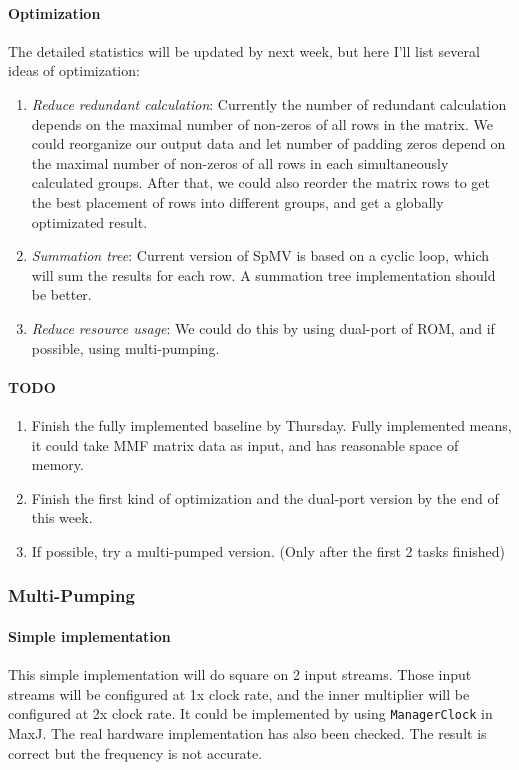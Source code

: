\paragraph{Optimization} The detailed statistics will be updated by next week, but here I'll list several ideas of optimization:
\begin{enumerate}
\item \textit{Reduce redundant calculation}: Currently the number of redundant calculation depends on the maximal number of non-zeros of all rows in the matrix. We could reorganize our output data and let number of padding zeros depend on the maximal number of non-zeros of all rows in each simultaneously calculated groups. After that, we could also reorder the matrix rows to get the best placement of rows into different groups, and get a globally optimizated result.
\item \textit{Summation tree}: Current version of SpMV is based on a cyclic loop, which will sum the results for each row. A summation tree implementation should be better.
\item \textit{Reduce resource usage}: We could do this by using dual-port of ROM, and if possible, using multi-pumping.
\end{enumerate}

\paragraph{TODO} 
\begin{enumerate}
\item Finish the fully implemented baseline by Thursday. Fully implemented means, it could take MMF matrix data as input, and has reasonable space of memory.
\item Finish the first kind of optimization and the dual-port version by the end of this week.
\item If possible, try a multi-pumped version. (Only after the first 2 tasks finished)
\end{enumerate}

\subsubsection{Multi-Pumping}

\paragraph{Simple implementation} This simple implementation will do square on 2 input streams. Those input streams will be configured at 1x clock rate, and the inner multiplier will be configured at 2x clock rate. It could be implemented by using \texttt{ManagerClock} in MaxJ. The real hardware implementation has also been checked. The result is correct but the frequency is not accurate.

